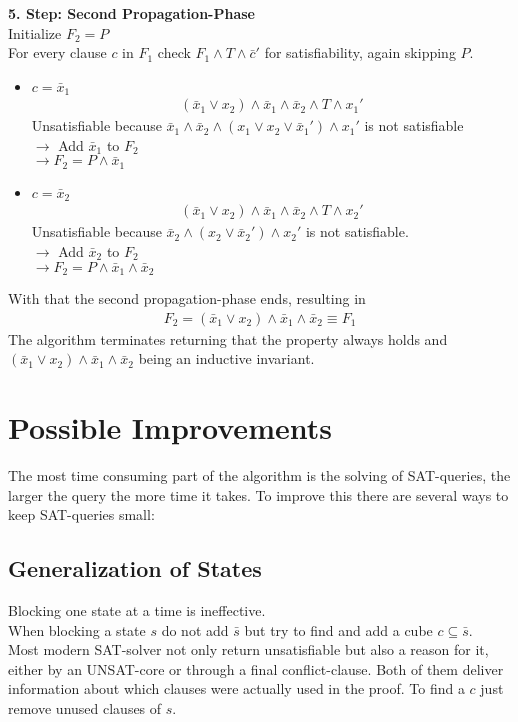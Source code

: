 \documentclass[11pt, a4paper, BCOR=10mm, ngerman, oneside]{scrbook}
\begin{document}
\textbf{5. Step: Second Propagation-Phase} \\
Initialize $F_2 = P$ \\
For every clause $c$ in $F_1$ check $F_1 \land T \land \bar c'$ for satisfiability, again skipping $P$. 
\begin{itemize}
\item $c = \bar x_1$
\begin{align*}
(\bar x_1 \lor x_2) \land \bar x_1 \land \bar x_2 \land T \land x_1'
\end{align*}
Unsatisfiable because $\bar x_1 \land \bar x_2 \land (x_1 \lor x_2 \lor \bar x_1') \land x_1'$ is not satisfiable \\
$\rightarrow$ Add $\bar x_1$ to $F_2$ \\
$\rightarrow F_2 = P \land \bar x_1$ \\

\item $c = \bar x_2$ 
\begin{align*}
(\bar x_1 \lor x_2) \land \bar x_1 \land \bar x_2 \land T \land x_2'
\end{align*}
Unsatisfiable because $\bar x_2 \land (x_2 \lor \bar x_2') \land x_2'$ is not satisfiable. \\
$\rightarrow$ Add $\bar x_2$ to $F_2$ \\
$\rightarrow F_2 = P \land \bar x_1 \land \bar x_2$

\end{itemize}

With that the second propagation-phase ends, resulting in 
\begin{align*}
F_2 = (\bar x_1 \lor x_2) \land \bar x_1 \land \bar x_2 \equiv F_1
\end{align*}
The algorithm terminates returning that the property always holds and $(\bar x_1 \lor x_2) \land \bar x_1 \land \bar x_2$ being an inductive invariant.

\section{Possible Improvements}
The most time consuming part of the algorithm is the solving of SAT-queries, the larger the query the more time it takes. To improve this there are several ways to keep SAT-queries small:

\subsection{Generalization of States}
Blocking one state at a time is ineffective.  \\
When blocking a state $s$ do not add $\bar s$ but try to find and add a cube $c \subseteq \bar s$. \\
Most modern SAT-solver not only return unsatisfiable but also a reason for it, either by an UNSAT-core or through a final conflict-clause. Both of them deliver information about which clauses were actually used in the proof. To find a $c$ just remove unused clauses of $s$.
\end{document}
